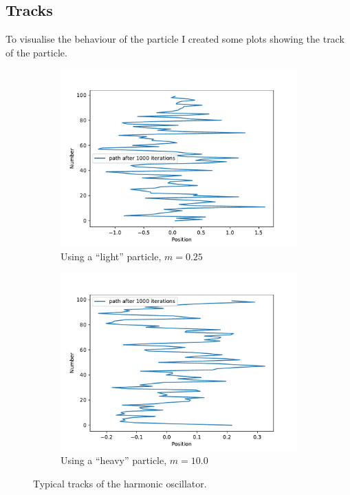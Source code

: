\documentclass{scrartcl}
\begin{document}
	\subsection{Tracks}
		To visualise the behaviour of the particle I created some plots showing the track of the particle.
		\begin{figure}[H]
			\centering
				\begin{subfigure}[c]{0.49\textwidth}
					\includegraphics[width=\textwidth]{../imgs/harmonic_oscillator_track/track_1000100_track_1000.pdf}
					\caption{Using a \enquote{light} particle, $m=0.25$}
					\label{fig:harmonic_oscillator_track_1000100_track_1000_light}
				\end{subfigure}
				\begin{subfigure}[c]{0.49\textwidth}
					\includegraphics[width=\textwidth]{../imgs/harmonic_oscillator_track/track_1000100_heavy_track_1000.pdf}
					\caption{Using a \enquote{heavy} particle, $m=10.0$}
					\label{fig:harmonic_oscillator_track_1000100_track_1000_heavy}
				\end{subfigure}
			\caption{Typical tracks of the harmonic oscillator.}
			\label{fig:harmonic_oscillator_track_1000100_track_1000}
		\end{figure}
\end{document}
